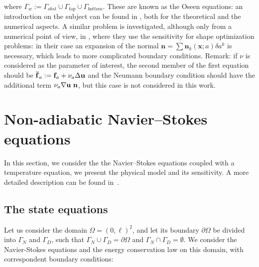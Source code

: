 where $\Gamma_w := \Gamma_{obst} \cup \Gamma_{top} \cup \Gamma_{bottom}$.
These are known as the Oseen equations: an introduction on the subject can be found in \cite{john2014oseen}, both for the theoretical and the numerical aspects. A similar problem is investigated, although only from a numerical point of view, in \cite{duvigneau2005evaluation,duvigneau2006improved}, where they use the sensitivity for shape optimization problems: in their case an expansion of the normal $\mathbf{n} = \sum \mathbf{n}_k(\mathbf{x};a)\delta a^k$ is necessary, which leads to more complicated boundary conditions.
Remark: if $\nu$ is considered as the parameter of interest, the second member of the first equation should be $\overline{\mathbf{f}}_a := \mathbf{f}_a+\nu_a\Delta\b_u$ and the Neumann boundary condition should have the additional term $\nu_a\nabla\b_u\ \mathbf{n}$, but this case is not considered in this work. 



\chapter{Non-adiabatic Navier–Stokes equations}
\label{sec_Taylor_T}

In this section, we consider the the Navier–Stokes equations coupled with a temperature equation, we present the physical model and its sensitivity. A more detailed description can be found in~\cite{FIORINI202425}.

\section{The state equations}
Let us consider the domain $\Omega = (0, \ell)^2${\color{black}, and let its boundary $\partial \Omega$ be divided into $\Gamma_N$ and $\Gamma_D$, such that $\Gamma_N \cup \Gamma_D = \partial \Omega$ and $\Gamma_N \cap \Gamma_D = \emptyset$}. We consider the Navier-Stokes equations and the energy conservation law on this domain, with correspondent boundary conditions:

